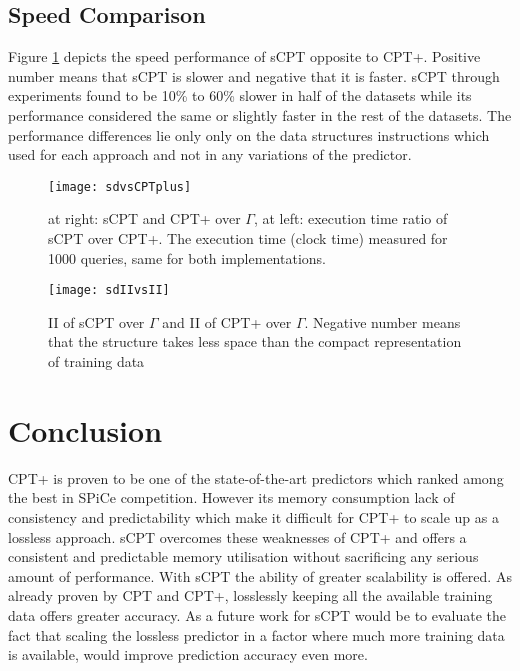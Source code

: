  \subsection*{Speed Comparison}
Figure \ref{fig:sdvsCPTplus} depicts the speed performance of sCPT opposite to CPT+. Positive number means that sCPT is slower and negative that it is faster. sCPT through experiments found to be 10\% to 60\% slower in half of the datasets while its performance considered the same or slightly faster in the rest of the datasets. The performance differences lie only only on the data structures instructions which used for each approach and not in any variations of the predictor. 
\begin{figure}[h]
    \centering
    \texttt{[image: sdvsCPTplus]}
    \caption{at right: sCPT and CPT+ over $\Gamma$, at left: execution time ratio of sCPT over CPT+. The execution time (clock time) measured for 1000 queries, same for both implementations.}
    \label{fig:sdvsCPTplus}
\end{figure}

\begin{figure}[h]
    \centering
    \texttt{[image: sdIIvsII]}
    \caption{II of sCPT over $\Gamma$ and II of CPT+ over $\Gamma$. Negative number means that the structure takes less space than the compact representation of training data}
    \label{fig:sdIIvsII}
\end{figure}

\section{Conclusion}
CPT+ is proven to be one of the state-of-the-art predictors which ranked among the best in SPiCe competition. However its memory consumption lack of consistency and predictability which make it difficult for CPT+ to scale up as a lossless approach. sCPT overcomes these weaknesses of CPT+ and offers a consistent and predictable memory utilisation without sacrificing any serious amount of performance. With sCPT the ability of greater scalability is offered. As already proven by CPT and CPT+, losslessly keeping all the available training data offers greater accuracy. As a future work for sCPT would be to evaluate the fact that scaling the lossless predictor in a factor where much more training data is available, would improve prediction accuracy even more.


\newpage